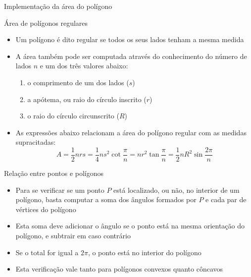 \begin{frame}[fragile]{Implementação da área do polígono}
\end{frame}

\begin{frame}[fragile]{Área de polígonos regulares}

    \begin{itemize}
        \item Um polígono é dito regular se todos os seus lados tenham a mesma medida

        \item A área também pode ser computada através do conhecimento do número de lados $n$ e um 
            dos três valores abaixo:
            \begin{enumerate}
                \item o comprimento de um dos lados ($s$)
                \item a apótema, ou raio do círculo inscrito ($r$)
                \item o raio do círculo circunscrito ($R$)
            \end{enumerate}

        \item As expressões abaixo relacionam a área do polígono regular com as medidas
            supracitadas:
        \[
            A = \frac{1}{2}nrs = \frac{1}{4}ns^2\cot \frac{\pi}{n} = nr^2\tan \frac{\pi}{n} = \frac{1}{2}nR^2\sin \frac{2\pi}{n}
        \]

    \end{itemize}

\end{frame}

\begin{frame}[fragile]{Relação entre pontos e polígonos}

    \begin{itemize}
        \item Para se verificar se um ponto $P$ está localizado, ou não, no interior de um 
            polígono, basta computar a soma dos ângulos formados por $P$ e cada par de vértices do 
            polígono

        \item Esta soma deve adicionar o ângulo se o ponto está na mesma orientação do polígono, e
        subtrair em caso contrário

        \item Se o total for igual a $2\pi$, o ponto está no interior do polígono

        \item Esta verificação vale tanto para polígonos convexos quanto côncavos

    \end{itemize}

\end{frame}

